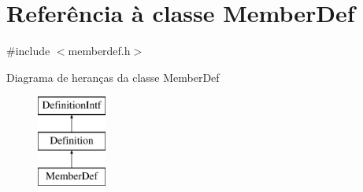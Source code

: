 \hypertarget{class_member_def}{\section{Referência à classe Member\-Def}
\label{class_member_def}
}


{\ttfamily \#include $<$memberdef.\-h$>$}

Diagrama de heranças da classe Member\-Def\begin{figure}[H]
\begin{center}
\leavevmode
\includegraphics[height=3.000000cm]{class_member_def}
\end{center}
\end{figure}
